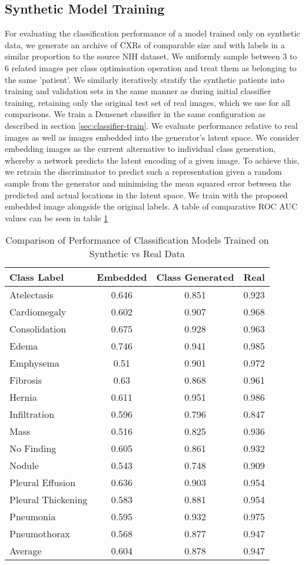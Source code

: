 \documentclass{article}
\begin{document}
\subsection{Synthetic Model Training}
\label{sec:synth-model}
For evaluating the classification performance of a model trained only on synthetic data, we generate an archive of CXRs of comparable size and with labels in a similar proportion to the source NIH dataset. We uniformly sample between \num{3} to \num{6} related images per class optimisation operation and treat them as belonging to the same 'patient'. We similarly iteratively stratify the synthetic patients into training and validation sets in the same manner as during initial classifier training, retaining only the original test set of real images, which we use for all comparisons. We train a Densenet classifier in the same configuration as described in section \ref{sec:classifier-train}. We evaluate performance relative to real images as well as images embedded into the generator's latent space. We consider embedding images as the current alternative to individual class generation, whereby a network predicts the latent encoding of a given image. To achieve this, we retrain the discriminator to predict such a representation given a random sample from the generator and minimising the mean squared error between the predicted and actual locations in the latent space. We train with the proposed embedded image alongside the original labels. 
A table of comparative ROC AUC values can be seen in table \ref{table:Synth-AUC}

\begin{table}[ht]
\centering \caption{Comparison of Performance of Classification Models Trained on Synthetic vs Real Data} 
\begin{tabular}{l c c c} 
\hline 
Class Label & Embedded & Class Generated & Real\\ [0.5ex] 
\hline \hline 
Atelectasis & 0.646 & 0.851 & 0.923 \\
Cardiomegaly & 0.602 & 0.907 & 0.968 \\
Consolidation & 0.675 & 0.928 & 0.963 \\
Edema & 0.746 & 0.941 & 0.985 \\
Emphysema & 0.51 & 0.901 & 0.972 \\
Fibrosis & 0.63 & 0.868 & 0.961 \\
Hernia & 0.611 & 0.951 & 0.986 \\
Infiltration & 0.596 & 0.796 & 0.847 \\
Mass & 0.516 & 0.825 & 0.936 \\
No Finding & 0.605 & 0.861 & 0.932 \\
Nodule & 0.543 & 0.748 & 0.909 \\
Pleural Effusion & 0.636 & 0.903 & 0.954 \\
Pleural Thickening & 0.583 & 0.881 & 0.954 \\
Pneumonia & 0.595 & 0.932 & 0.975 \\
Pneumothorax & 0.568 & 0.877 & 0.947 \\
\hline Average & 0.604 & 0.878 & 0.947 \\
\hline \end{tabular}
\label{table:Synth-AUC} 
\end{table}
\end{document}
